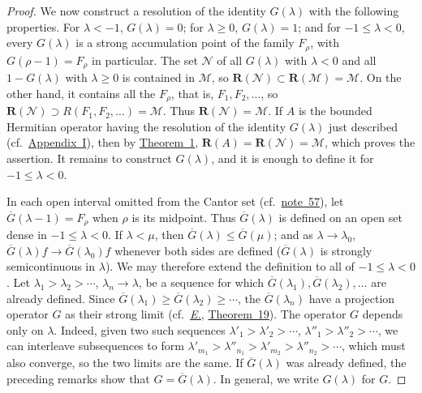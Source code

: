 \documentclass[
  paper=b5,
  twoside=true,
  fontsize=13pt,
  headings=normal,
  bookmarkpackage=false
]{scrartcl}
\theoremstyle{definition}
\newcommand{\NoteRef}[1]{\hyperref[fn:#1]{note~#1}}
\newcommand{\TheoremRef}[1]{\hyperref[thm:#1]{Theorem~#1}}
\newcommand{\Eref}{\hyperref[fn:E-paper]{\emph{E.}}}
\newcommand{\ErefText}[1]{\href{https://doi.org/10.1007/BF01782338}{#1}}
\newcommand{\GeneratedRing}{\boldsymbol{R}}
\begin{document}
\begin{proof}
We now construct a resolution of the identity \(G(\lambda)\) with the
following properties. For \(\lambda<-1\), \(G(\lambda)=0\); for
\(\lambda\geq0\), \(G(\lambda)=1\); and for \(-1\leq\lambda<0\),
every \(G(\lambda)\) is a strong accumulation point of the family
\(F_\rho\), with \(G(\rho-1)=F_\rho\) in particular. The set
\(\mathcal N\) of all \(G(\lambda)\) with \(\lambda<0\) and all
\(1-G(\lambda)\) with \(\lambda\geq0\) is contained in \(\mathcal M\),
so \(\GeneratedRing (\mathcal N)\subset \GeneratedRing (\mathcal M)=\mathcal M\). On the
other hand, it contains all the \(F_\rho\), that is, \(F_1,F_2,\ldots\),
so \(\GeneratedRing (\mathcal N)\supset R(F_1,F_2,\ldots)=\mathcal M\).
Thus \(\GeneratedRing (\mathcal N)=\mathcal M\). If \(A\) is the bounded
Hermitian operator having the resolution of the identity \(G(\lambda)\)
just described (cf.\ \hyperref[app:bounded-spectral-families]{Appendix~I}),
then by \TheoremRef{1}, \(\GeneratedRing (A)=\GeneratedRing (\mathcal N)=\mathcal M\), which
proves the assertion. It remains to construct \(G(\lambda)\), and it is
enough to define it for \(-1\leq\lambda<0\).

In each open interval omitted from the Cantor set (cf.\ \NoteRef{57}),
let \(\overline G(\lambda-1)=F_\rho\) when \(\rho\) is its midpoint.
Thus \(\overline G(\lambda)\) is defined on an open set dense in
\(-1\leq\lambda<0\). If \(\lambda<\mu\), then
\(\overline G(\lambda)\leq\overline G(\mu)\); and as
\(\lambda\to\lambda_0\), \(\overline G(\lambda)f\to\overline G(\lambda_0)f\)
whenever both sides are defined (\(\overline G(\lambda)\) is strongly
semicontinuous in \(\lambda\)). We may therefore extend the definition
to all of \(-1\leq\lambda<0\). Let \(\lambda_1>\lambda_2>\cdots\),
\(\lambda_n\to\lambda\), be a sequence for which
\(\overline G(\lambda_1),\overline G(\lambda_2),\ldots\) are already
defined. Since \(\overline G(\lambda_1)\geq\overline G(\lambda_2)\geq
\cdots\), the \(\overline G(\lambda_n)\) have a projection operator \(G\)
as their strong limit (cf.\ \Eref, \ErefText{Theorem~19}). The operator \(G\)
depends only on \(\lambda\). Indeed, given two such sequences
\(\lambda'_1>\lambda'_2>\cdots\), \(\lambda''_1>\lambda''_2>\cdots\),
we can interleave subsequences to form
\(\lambda'_{m_1}>\lambda''_{n_1}>\lambda'_{m_2}>\lambda''_{n_2}>\cdots\),
which must also converge, so the two limits are the same. If
\(\overline G(\lambda)\) was already defined, the preceding remarks
show that \(G=\overline G(\lambda)\). In general, we write \(G(\lambda)\)
for \(G\).


\end{proof}
\end{document}
